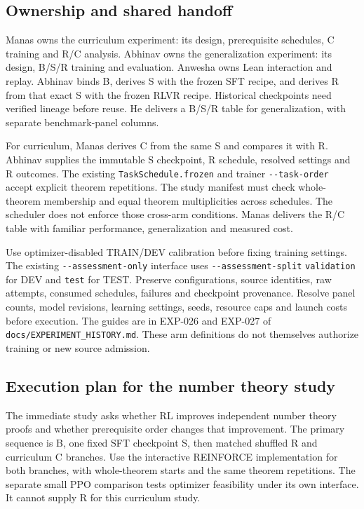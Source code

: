 \documentclass[11pt]{article}
\newcommand{\code}[1]{\texttt{#1}}
\newcommand{\pth}[1]{\nolinkurl{#1}}
\begin{document}
\subsection{Ownership and shared handoff}

Manas owns the curriculum experiment: its design, prerequisite schedules, C training and R/C analysis.
Abhinav owns the generalization experiment: its design, B/S/R training and evaluation.
Anwesha owns Lean interaction and replay.
Abhinav binds B, derives S with the frozen SFT recipe, and derives R from that exact S with the frozen RLVR recipe.
Historical checkpoints need verified lineage before reuse.
He delivers a B/S/R table for generalization, with separate benchmark-panel columns.

For curriculum, Manas derives C from the same S and compares it with R.
Abhinav supplies the immutable S checkpoint, R schedule, resolved settings and R outcomes.
The existing \code{TaskSchedule.frozen} and trainer \pth{--task-order} accept explicit theorem repetitions.
The study manifest must check whole-theorem membership and equal theorem multiplicities across schedules.
The scheduler does not enforce those cross-arm conditions.
Manas delivers the R/C table with familiar performance, generalization and measured cost.

Use optimizer-disabled TRAIN/DEV calibration before fixing training settings.
The existing \pth{--assessment-only} interface uses \pth{--assessment-split} \code{validation} for DEV and \code{test} for TEST.
Preserve configurations, source identities, raw attempts, consumed schedules, failures and checkpoint provenance.
Resolve panel counts, model revisions, learning settings, seeds, resource caps and launch costs before execution.
The guides are in EXP-026 and EXP-027 of \pth{docs/EXPERIMENT_HISTORY.md}.
These arm definitions do not themselves authorize training or new source admission.

\subsection{Execution plan for the number theory study}
\label{sec:nt-curriculum-execution}

The immediate study asks whether RL improves independent number theory proofs and whether prerequisite order changes that improvement.
The primary sequence is B, one fixed SFT checkpoint S, then matched shuffled R and curriculum C branches.
Use the interactive REINFORCE implementation for both branches, with whole-theorem starts and the same theorem repetitions.
The separate small PPO comparison tests optimizer feasibility under its own interface.
It cannot supply R for this curriculum study.
\end{document}
